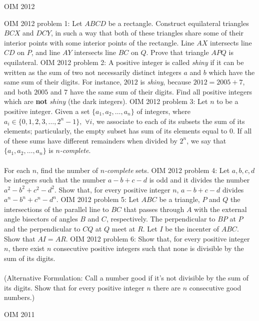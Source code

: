 OIM 2012 

OIM 2012 problem 1:  Let $ABCD$ be a rectangle. Construct equilateral triangles $BCX$ and $DCY$, in such a way that both of these triangles share some of their interior points with some interior points of the rectangle. Line $AX$ intersects line $CD$ on $P$, and line $AY$ intersects line $BC$ on $Q$. Prove that triangle $APQ$ is equilateral. 
OIM 2012 problem 2:  A positive integer is called \textit{shiny} if it can be written as the sum of two not necessarily distinct integers $a$ and $b$ which have the same sum of their digits. For instance, $2012$ is \textit{shiny}, because $2012 = 2005 + 7$, and both $2005$ and $7$ have the same sum of their digits. Find all positive integers which are \textbf{not} \textit{shiny} (the dark integers). 
OIM 2012 problem 3:  Let $n$ to be a positive integer. Given a set $\{ a_1, a_2, \ldots, a_n \} $ of integers, where $a_i \in \{ 0, 1, 2, 3, \ldots, 2^n -1 \},$ $\forall i$, we associate to each of its subsets the sum of its elements; particularly, the empty subset has sum of its elements equal to $0$. If all of these sums have different remainders when divided by $2^n$, we say that $\{ a_1, a_2, \ldots, a_n \} $ is \textit{$n$-complete}. \\\\
For each $n$, find the number of \textit{$n$-complete} sets. 
OIM 2012 problem 4:  Let $a,b,c,d$ be integers such that the number $a-b+c-d$ is odd and it divides the number $a^2-b^2+c^2-d^2$. Show that, for every positive integer $n$, $a-b+c-d$ divides $a^n-b^n+c^n-d^n$. 
OIM 2012 problem 5:  Let $ABC$ be a triangle, $P$ and $Q$ the intersections of the parallel line to $BC$ that passes through $A$ with the external angle bisectors of angles $B$ and $C$, respectively. The perpendicular to $BP$ at $P$ and the perpendicular to $CQ$ at $Q$ meet at $R$. Let $I$ be the incenter of $ABC$. Show that $AI  = AR$. 
OIM 2012 problem 6:  Show that, for every positive integer $n$, there exist $n$ consecutive positive integers such that none is divisible by the sum of its digits. \\\\
(Alternative Formulation: Call a number good if it's not divisible by the sum of its digits. Show that for every positive integer $n$ there are $n$ consecutive good numbers.) 

OIM 2011 

